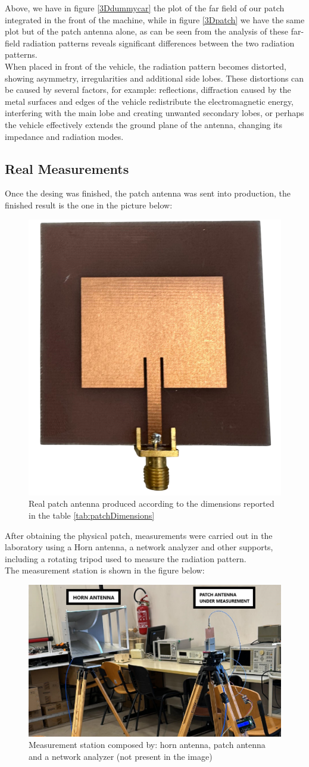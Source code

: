 \documentclass[]{article}
\begin{document}
Above, we have in figure \eqref{3Ddummycar} the plot of the far field of our patch integrated in the front of the machine, while in figure \eqref{3Dpatch} we have the same plot but of the patch antenna alone, as can be seen from the analysis of these far-field radiation patterns reveals significant differences between the two radiation patterns.\\
When placed in front of the vehicle, the radiation pattern becomes distorted, showing asymmetry, irregularities and additional side lobes. These distortions can be caused by several factors, for example: reflections, diffraction caused by the metal surfaces and edges of the vehicle redistribute the electromagnetic energy, interfering with the main lobe and creating unwanted secondary lobes, or perhaps the vehicle effectively extends the ground plane of the antenna, changing its impedance and radiation modes. 



\subsection{Real Measurements}
Once the desing was finished, the patch antenna was sent into production, the finished result is the one in the picture below:
\begin{figure}[h]
	\centering
	\includegraphics[width=0.35\linewidth]{img/img12}
	\caption{Real patch antenna produced according to the dimensions reported in the table \eqref{tab:patchDimensions}}
	\label{realpatch}
\end{figure}


After obtaining the physical patch, measurements were carried out in the laboratory using a Horn antenna, a network analyzer and other supports, including a rotating tripod used to measure the radiation pattern.\\
The measurement station is shown in the figure below:
\begin{figure}[H]
	\centering
	\includegraphics[width=0.5\linewidth]{img/img13}
	\caption{Measurement station composed by: horn antenna, patch antenna and a network analyzer (not present in the image)}
	\label{MEASSTATION}
\end{figure}
\end{document}
